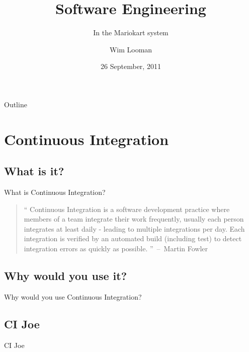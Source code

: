 \documentclass[xcolor=dvipsnames]{beamer}
\author{Wim Looman}
\title{Software Engineering}
\subtitle{In the Mariokart system}
\institute[UC]
{
  Department of Electrical Engineering\\
  University of Canterbury\\
  New Zealand
}
\date{26 September, 2011}
\newcommand{\authorquote}[2]{\begin{quote}``#2''\textnormal{~--~#1}\end{quote}}
\begin{document}
  \begin{frame}[plain]
    \titlepage
  \end{frame}

  \begin{frame}{Outline}
    \begin{center}
      \begin{minipage}{0.5\linewidth}
        \tableofcontents
      \end{minipage}
    \end{center}
  \end{frame}

  \section{Continuous Integration}
    \subsection{What is it?}
      \begin{frame}{What is Continuous Integration?}
        \begin{definition}
          \authorquote{Martin Fowler\footnotemark}{%
            Continuous Integration is a software development practice where
            members of a team integrate their work frequently, usually each
            person integrates at least daily - leading to multiple integrations
            per day.  Each integration is verified by an automated build
            (including test) to detect integration errors as quickly as
            possible.%
          }
        \end{definition}
      \end{frame}

    \subsection{Why would you use it?}
      \begin{frame}{Why would you use Continuous Integration?}
      \end{frame}

    \subsection{CI Joe}
      \begin{frame}{CI Joe}
      \end{frame}
\end{document}

